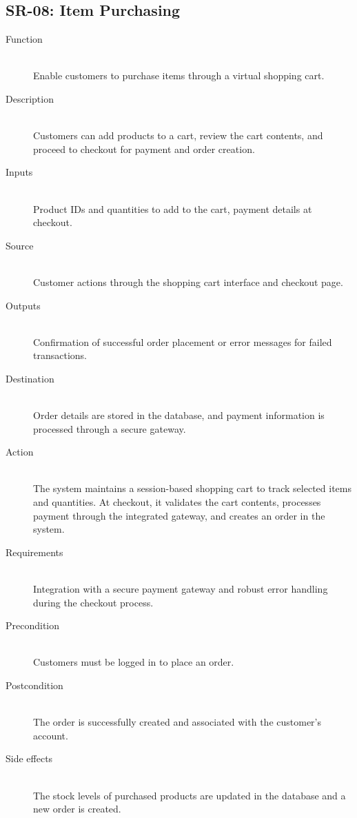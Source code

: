 \documentclass[twoside,a4paper,journal]{IEEEtran}
\begin{document}
\subsection{SR-08: Item Purchasing}
\begin{description}
  \item[Function] \hfill \\
  Enable customers to
  purchase items through a virtual shopping cart.
  \item[Description] \hfill \\
  Customers can add products to a cart, review the cart
  contents, and proceed to checkout for payment and order creation.
  \item[Inputs] \hfill \\
  Product IDs and quantities to add to the cart, payment
  details at checkout.
  \item[Source] \hfill \\
  Customer actions through the shopping cart interface
  and checkout page.
  \item[Outputs] \hfill \\
  Confirmation of successful order placement or error
  messages for failed transactions.
  \item[Destination] \hfill \\
  Order details are stored in the database, and payment
  information is processed through a secure gateway.
  \item[Action] \hfill \\
  The system maintains a session-based shopping cart to
  track selected items and quantities. At checkout, it validates the cart
  contents, processes payment through the integrated gateway, and creates an
  order in the system.
  \item[Requirements] \hfill \\
  Integration with a secure payment gateway and robust
  error handling during the checkout process.
  \item[Precondition] \hfill \\
  Customers must be logged in to place an order.
  \item[Postcondition] \hfill \\
  The order is successfully created and associated with
  the customer's account.
  \item[Side effects] \hfill \\
  The stock levels of purchased products are updated in
  the database and a new order is created.
\end{description}
\end{document}
